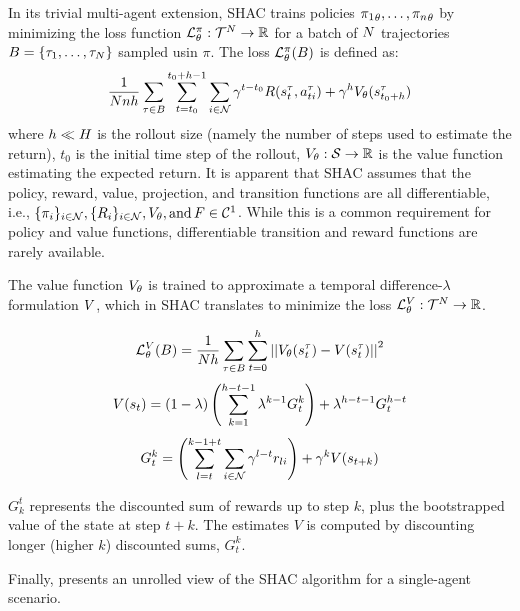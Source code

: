 In its trivial multi-agent extension, SHAC trains policies ${\pi_1}_\theta,\dots,{\pi_n}_\theta$ by minimizing the loss function $\mathcal{L}_\theta^{\pi}:\mathcal{T}^N\rightarrow\mathbb{R}$ for a batch of $N$ trajectories $B = \{\tau_1, \ldots, \tau_N\}$ sampled usin $\pi$. The loss $\mathcal{L}_\theta^{\pi}(B)$ is defined as:  
\begin{equation*}\label{eq:shac}
    \frac{1}{Nnh}\sum_{\tau\in B} \sum_{t=t_0}^{t_0+h-1} \sum_{i\in\mathcal{N}} \gamma^{t-t_0} R(s_{t}^\tau, a_{ti}^\tau) + \gamma^h V_\theta(s^\tau_{t_0+h})
\end{equation*}
where $h \ll H$ is the rollout size (namely the number of steps used to estimate the return), $t_0$ is the initial time step of the rollout, $V_\theta: \mathcal{S} \rightarrow \mathbb{R}$ is the value function estimating the expected return. It is apparent that SHAC assumes that the policy, reward, value, projection, and transition functions are all differentiable, i.e., $\{\pi_{i}\}_{i\in\mathcal{N}},\{R_{i}\}_{i\in\mathcal{N}},V_\theta, \text{and} \, F \in \mathcal{C}^1$. While this is a common requirement for policy and value functions, differentiable transition and reward functions are rarely available. 

The value function $V_\theta$ is trained to approximate a temporal difference-$\lambda$ formulation \cite{Sutton98} $V$, which in SHAC translates to minimize the loss $\mathcal{L}_\theta^{V}:\mathcal{T}^N\rightarrow\mathbb{R}$.

$$ \mathcal{L}_\theta^V(B)=\frac{1}{Nh}\sum_{\tau\in B}\sum_{t=0}^h\left|\left| V_\theta(s^\tau_t) - V(s^\tau_t) \right|\right|^2 $$
$$ V(s_t) = (1-\lambda) \left(\sum_{k=1}^{h-t-1}\lambda^{k-1}G_t^k\right) + \lambda^{h-t-1}G_t^{h-t}$$
$$ G_t^k = \left(\sum_{l=t}^{k-1+t}\sum_{i\in\mathcal{N}}\gamma^{l-t} r_{li}\right) + \gamma^k V(s_{t+k})$$

$G^t_k$ represents the discounted sum of rewards up to step $k$, plus the bootstrapped value of the state at step $t+k$. The estimates $V$ is computed by discounting longer (higher $k$) discounted sums, $G^k_t$.

Finally,  presents an unrolled view of the SHAC algorithm for a single-agent scenario.
